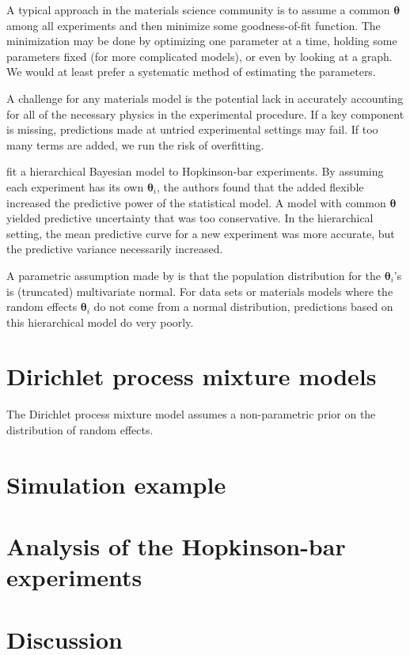 \documentclass[12pt]{article}
\newcommand{\m}[1]{\mathbf{\bm{#1}}}
\begin{document}
A typical approach in the materials science community is to assume a common $\m{\theta}$ among all experiments and then minimize some goodness-of-fit function. The minimization may be done by optimizing one parameter at a time, holding some parameters fixed (for more complicated models), or even by looking at a graph. We would at least prefer a systematic method of estimating the parameters.

A challenge for any materials model is the potential lack in accurately accounting for all of the necessary physics in the experimental procedure. If a key component is missing, predictions made at untried experimental settings may fail. If too many terms are added, we run the risk of overfitting.

\cite{fugate2005hierarchical} fit a hierarchical Bayesian model to Hopkinson-bar experiments. By assuming each experiment has its own $\m{\theta}_i$, the authors found that the added flexible increased the predictive power of the statistical model. A model with common $\m{\theta}$ yielded predictive uncertainty that was too conservative. In the hierarchical setting, the mean predictive curve for a new experiment was more accurate, but the predictive variance necessarily increased.

A parametric assumption made by \cite{fugate2005hierarchical} is that the population distribution for the $\m{\theta}_i$'s is (truncated) multivariate normal. For data sets or materials models where the random effects $\m{\theta}_i$ do not come from a normal distribution, predictions based on this hierarchical model do very poorly.

\section{Dirichlet process mixture models}

The Dirichlet process mixture model assumes a non-parametric prior on the distribution of random effects.

\section{Simulation example}

\section{Analysis of the Hopkinson-bar experiments}

\section{Discussion}
\end{document}
